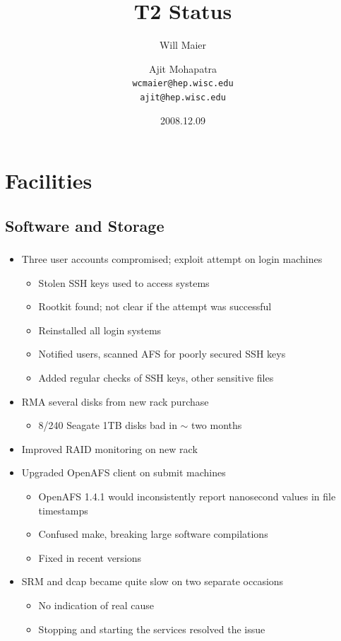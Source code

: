 \documentclass{beamer}
\title{T2 Status}
\author[Maier, Mohapatra]{
    Will Maier \and Ajit Mohapatra\\ 
    {\tt wcmaier@hep.wisc.edu}\\
    {\tt ajit@hep.wisc.edu}}
\institute[Wisconsin]{University of Wisconsin - High Energy Physics}
\date{2008.12.09}
\newcommand{\ca}{\ensuremath{\sim}}
\begin{document}
\begin{frame}
    \titlepage
\end{frame}


\section{Facilities}
\subsection{Software and Storage}
\begin{frame}
\frametitle{}
\begin{itemize}
    \item Three user accounts compromised; exploit attempt on login machines
    \begin{itemize}
        \item Stolen SSH keys used to access systems
        \item Rootkit found; not clear if the attempt was successful
        \item Reinstalled all login systems
        \item Notified users, scanned AFS for poorly secured SSH keys
        \item Added regular checks of SSH keys, other sensitive files
    \end{itemize}
    \item RMA several disks from new rack purchase
    \begin{itemize}
        \item 8/240 Seagate 1TB disks bad in \ca{} two months
    \end{itemize}
    \item Improved RAID monitoring on new rack
    \item Upgraded OpenAFS client on submit machines
    \begin{itemize}
        \item OpenAFS 1.4.1 would inconsistently report nanosecond values in file timestamps
        \item Confused make, breaking large software compilations
        \item Fixed in recent versions
    \end{itemize}
    \item SRM and dcap became quite slow on two separate occasions
    \begin{itemize}
        \item No indication of real cause
        \item Stopping and starting the services resolved the issue
    \end{itemize}
\end{itemize}
\end{frame}
\end{document}
